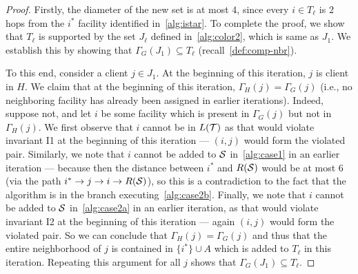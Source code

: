\begin{proof}
Firstly, the diameter of the new set is at most $4$, since every $i \in T_\ell$ is $2$ hops from the $i^*$ facility identified in~\cref{alg:istar}. To complete the proof, we show that $T_\ell$ is supported by the set $J_\ell$ defined in~\cref{alg:color2}, which is same as $J_1$. %
We establish this by showing that $\Gamma_G(J_1) \subseteq T_\ell$ (recall~\cref{def:comp-nbr}).

To this end, consider a client $j \in J_1$. At the beginning of this iteration, $j$ is client  in $H$.
We claim that at the beginning of this iteration, $\Gamma_H(j) = \Gamma_G(j)$ (i.e., no neighboring facility has already been assigned in earlier iterations). Indeed, suppose not, and let $i$ be some facility which is present in $\Gamma_G(j)$ but not in $\Gamma_H(j)$. We first observe that $i$ cannot be in $L({\cal T})$ as that would violate invariant I1 at the beginning of this iteration --- $(i,j)$ would form the violated pair. Similarly, we note that $i$ cannot be added to ${\cal S}$ in~\cref{alg:case1} in an earlier iteration --- because then the distance between $i^*$ and $R({\cal S})$ would be at most $6$ (via the path $i^* \rightarrow j \rightarrow i \rightarrow R({\cal S})$), so this is a contradiction to the fact that the algorithm is in the branch executing~\cref{alg:case2b}. Finally, we note that $i$ cannot be added to ${\cal S}$ in~\cref{alg:case2a} in an earlier iteration, as that would violate invariant I2 at the beginning of this iteration --- again $(i,j)$ would form the violated pair.
So we can conclude that $\Gamma_H(j) = \Gamma_G(j)$ and thus that the entire neighborhood of $j$ is contained in $\{i^*\} \cup A$ which is added to $T_\ell$ in this iteration. Repeating this argument for all $j$ shows that $\Gamma_G(J_1) \subseteq T_\ell$.
\end{proof}

